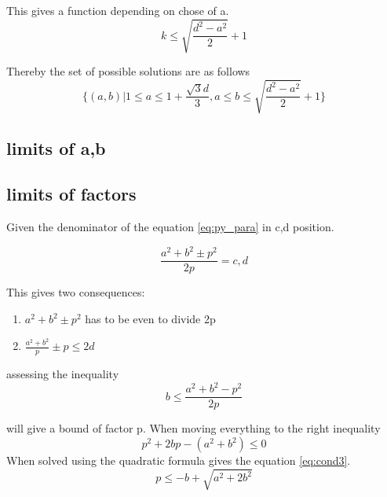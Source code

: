 \documentclass{article}
\begin{document}
This gives a function depending on chose of a.
$$
	k \le \sqrt{\frac{d^2-a^2}{2}}+1
$$

Thereby the set of possible solutions are as follows
$$
\{(a,b) | 1\le a \le 1+\frac{\sqrt{3}d}{3}, a \le b \le \sqrt{\frac{d^2-a^2}{2}}+1\}
$$

\subsection{limits of a,b}

\subsection{limits of factors}

Given the denominator of the equation \ref{eq:py_para} in c,d position.

$$
  	\frac{a^2+b^2\pm p^2}{2p} = c,d
$$	

This gives two consequences:
\begin{enumerate}
	\item $a^2+b^2 \pm p^2$ has to be even to divide 2p
	\item $\frac{a^2+b^2}{p} \pm p \le 2d$
\end{enumerate}

assessing the inequality 
$$
b \le \frac{a^2+b^2-p^2}{2p}
$$

will give a bound of factor p. When moving everything to the right inequality 
$$
p^2 + 2bp - (a^2+b^2) \le 0
$$
When solved using the quadratic formula gives the equation \ref{eq:cond3}.
\begin{equation}\label{eq:cond3}
	p \le -b + \sqrt{a^2 + 2b^2}
\end{equation}
\end{document}
